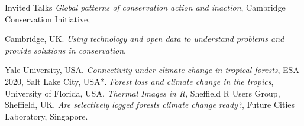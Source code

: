 \begin{rubric}{Invited Talks}
\entry*[2022] \emph{Global patterns of conservation action and inaction}, Cambridge Conservation Initiative, \par Cambridge, UK.
\entry*[2021] \emph{Using technology and open data to understand problems and provide solutions in conservation}, \par Yale University, USA.
\entry*[2021] \emph{Connectivity under climate change in tropical forests}, ESA 2020, Salt Lake City, USA*.
\entry*[2019] \emph{Forest loss and climate change in the tropics}, University of Florida, USA.
\entry*[2017] \emph{Thermal Images in R}, Sheffield R Users Group, Sheffield, UK.
\entry*[2016] \emph{Are selectively logged forests climate change ready?}, Future Cities Laboratory, Singapore.
\end{rubric}